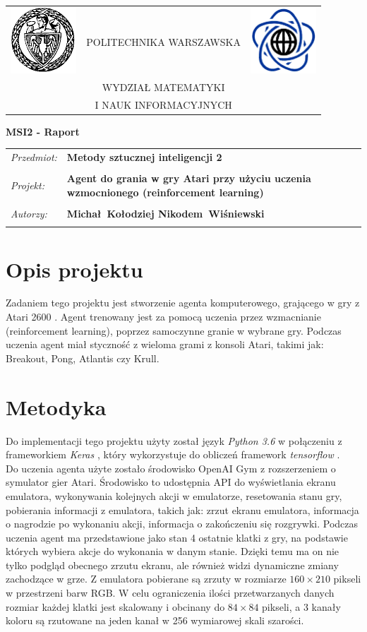 \documentclass[12pt]{article}
\renewcommand{\maketitle}{
\begin{titlepage}
\begin{table}[t]
\centering
\begin{tabular}[t]{lcr}
 \includegraphics[width=70pt,height=70pt]{PW} & POLITECHNIKA WARSZAWSKA & \includegraphics[width=70pt,height=70pt]{MiNI}\\
& WYDZIAŁ MATEMATYKI & \\
& I NAUK INFORMACYJNYCH &
\end{tabular}
\end{table}
\vspace*{3cm}
  \begin{center}
    \LARGE
    \textbf {MSI2 - Raport}\\
   \vspace*{2 cm}
\begin{table}[!htp]
\begin{tabular}{p{4cm}p{9cm}}
\textit{Przedmiot:} &\textbf {Metody sztucznej inteligencji 2} \\
\\
\textit{Projekt:} &\textbf {Agent do grania w gry Atari przy użyciu uczenia wzmocnionego (reinforcement learning)} \\
\\
\textit{Autorzy:} &\textbf {Michał~Kołodziej \newline Nikodem~Wiśniewski} \\
\\
\end{tabular}
\end{table}

\vspace{5 cm}
  \center{\small Warszawa, dnia \today}
\end{center}
\end{titlepage}
}
\begin{document}
\maketitle

\tableofcontents

\newpage

\section{Opis projektu}
Zadaniem tego projektu jest stworzenie agenta komputerowego, grającego w gry z Atari 2600 \cite{atari}. Agent trenowany jest za pomocą uczenia przez wzmacnianie (reinforcement learning), poprzez samoczynne granie w wybrane gry. Podczas uczenia agent miał styczność z wieloma grami z konsoli Atari, takimi jak: Breakout, Pong, Atlantis czy Krull.

\section{Metodyka}

Do implementacji tego projektu użyty został język \textit{Python 3.6} w połączeniu z frameworkiem \textit{Keras} \cite{keras}, który wykorzystuje do obliczeń framework \textit{tensorflow} \cite{tensorflow}. \\
Do uczenia agenta użyte zostało środowisko OpenAI Gym \cite{gym} z rozszerzeniem o symulator gier Atari. Środowisko to udostępnia API do wyświetlania ekranu emulatora, wykonywania kolejnych akcji w emulatorze, resetowania stanu gry, pobierania informacji z emulatora, takich jak: zrzut ekranu emulatora, informacja o nagrodzie po wykonaniu akcji, informacja o zakończeniu się rozgrywki. Podczas uczenia agent ma przedstawione jako stan 4 ostatnie klatki z gry, na podstawie których wybiera akcje do wykonania w danym stanie. Dzięki temu ma on nie tylko podgląd obecnego zrzutu ekranu, ale również widzi dynamiczne zmiany zachodzące w grze. Z emulatora pobierane są zrzuty w rozmiarze $160\times210$ pikseli w przestrzeni barw RGB. W celu ograniczenia ilości przetwarzanych danych rozmiar każdej klatki jest skalowany i obcinany do $84\times84$ pikseli, a 3 kanały koloru są rzutowane na jeden kanał w 256 wymiarowej skali szarości.
\\\
\end{document}

